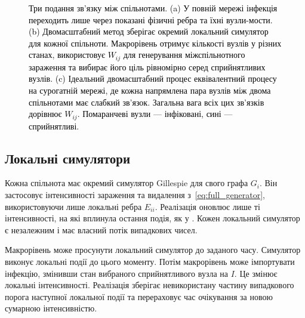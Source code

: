 \documentclass[a4paper,fleqn]{cas-sc}
\begin{document}
\begin{figure}[tbp]
\caption{\textcolor{black}{Три подання зв'язку між спільнотами. (a) У повній мережі інфекція переходить лише через показані фізичні ребра та їхні вузли-мости. (b) Двомасштабний метод зберігає окремий локальний симулятор для кожної спільноти. Макрорівень отримує кількості вузлів у різних станах, використовує $W_{ij}$ для генерування міжспільнотного зараження та вибирає його ціль рівномірно серед сприйнятливих вузлів. (c) Ідеальний двомасштабний процес еквівалентний процесу на сурогатній мережі, де кожна напрямлена пара вузлів між двома спільнотами має слабкий зв'язок. Загальна вага всіх цих зв'язків дорівнює $W_{ij}$. Помаранчеві вузли --- інфіковані, сині --- сприйнятливі.}}
\label{fig:schematic}
\end{figure}

\subsection{Локальні симулятори}
\label{sec:local}

Кожна спільнота має окремий симулятор Gillespie для свого графа $G_i$. Він застосовує інтенсивності зараження та видалення з~\eqref{eq:full_generator}, використовуючи лише локальні ребра $E_{ii}$. Реалізація оновлює лише ті інтенсивності, на які вплинула остання подія, як у \citet{kuryliak2025simulating}. Кожен локальний симулятор є незалежним і має власний потік випадкових чисел.

Макрорівень може просунути локальний симулятор до заданого часу. Симулятор виконує локальні події до цього моменту. Потім макрорівень може імпортувати інфекцію, змінивши стан вибраного сприйнятливого вузла на $I$. Це змінює локальні інтенсивності. Реалізація зберігає невикористану частину випадкового порога наступної локальної події та перераховує час очікування за новою сумарною інтенсивністю. 
\end{document}
